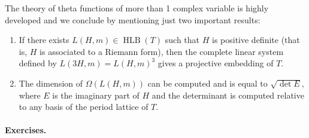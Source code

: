 The theory of theta functions of more than 1 complex variable is highly developed and we conclude by mentioning just two important results:
\begin{enumerate}
\item If there exists $L(H,m)\in\operatorname{HLB}(T)$ such that $H$ is positive definite (that is, $H$ is associated to a Riemann form), then the complete linear system defined by $L(3H,m)=L(H,m)^3$ gives a projective embedding of $T$.
\item The dimension of $\Omega(L(H,m))$ can be computed and is equal to $\sqrt{\det E}$, where $E$ is the imaginary part of $H$ and the determinant is computed relative to any basis of the period lattice of $T$.
\end{enumerate}
\paragraph{Exercises.}
